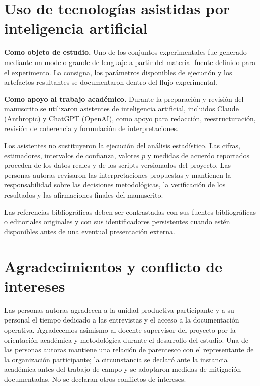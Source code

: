 \documentclass[runningheads]{llncs}
\begin{document}
\section*{Uso de tecnolog\'ias asistidas por inteligencia artificial}

\textbf{Como objeto de estudio.} Uno de los conjuntos experimentales fue generado
mediante un modelo grande de lenguaje a partir del material fuente definido para
el experimento. La consigna, los par\'ametros disponibles de ejecuci\'on y los
artefactos resultantes se documentaron dentro del flujo experimental.

\textbf{Como apoyo al trabajo acad\'emico.} Durante la preparaci\'on y revisi\'on
del manuscrito se utilizaron asistentes de inteligencia artificial, incluidos
Claude (Anthropic) y ChatGPT (OpenAI), como apoyo para redacci\'on,
reestructuraci\'on, revisi\'on de coherencia y formulaci\'on de interpretaciones.

Los asistentes no sustituyeron la ejecuci\'on del an\'alisis estad\'istico. Las
cifras, estimadores, intervalos de confianza, valores $p$ y medidas de acuerdo
reportados proceden de los datos reales y de los scripts versionados del proyecto.
Las personas autoras revisaron las interpretaciones propuestas y mantienen la
responsabilidad sobre las decisiones metodol\'ogicas, la verificaci\'on de los
resultados y las afirmaciones finales del manuscrito.

Las referencias bibliogr\'aficas deben ser contrastadas con sus fuentes
bibliogr\'aficas o editoriales originales y con sus identificadores persistentes
cuando est\'en disponibles antes de una eventual presentaci\'on externa.

\section*{Agradecimientos y conflicto de intereses}

Las personas autoras agradecen a la unidad productiva participante y a su personal
el tiempo dedicado a las entrevistas y el acceso a la documentaci\'on operativa. Agradecemos
asimismo al docente supervisor del proyecto por la orientaci\'on acad\'emica y metodol\'ogica durante
el desarrollo del estudio. Una de las personas autoras mantiene una relaci\'on de parentesco con el representante de la organizaci\'on participante; la circunstancia se declar\'o ante la instancia
acad\'emica antes del trabajo de campo y se adoptaron medidas de mitigaci\'on
documentadas. No se declaran otros conflictos de intereses.

\enlargethispage{3\baselineskip}


\end{document}
